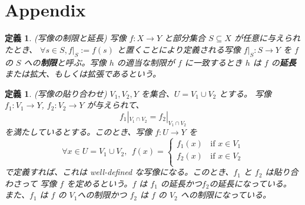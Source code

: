 \documentclass[uplatex, 12pt]{jsreport}
\newtheorem{dfn}[thm]{定義}
\begin{document}
\chapter*{Appendix}

\begin{dfn}{(写像の制限と延長)}
    写像 $f:X \to Y$ と部分集合 $S \subseteq X$ が任意に与えられたとき、
    $\forall s \in S, f|_S := f(s)$ と置くことにより定義される写像 $f|_S: S \to Y$ を
    $f$ の $S$ への\textbf{制限}と呼ぶ。写像 $h$ の適当な制限が $f$ に一致するとき $h$ は
     $f$ の\textbf{延長}または拡大、もしくは拡張であるという。
\end{dfn}

\begin{dfn}{(写像の貼り合わせ)}
    $V_1, V_2, Y$ を集合、$U = V_1 \cup V_2$ とする。
    写像 $f_1 : V_1 \to Y$, $f_2 : V_2 \to Y$ が与えられて、
    \[
        f_1|_{V_1 \cap V_2} = f_2|_{V_1 \cap V_2}
    \]
    を満たしているとする。このとき、写像 $f: U \to Y$ を
    \[
        \forall x \in U = V_1 \cup V_2, \ \ f(x) =
        \begin{cases}
            f_1(x) \ \ \ \ \text{if } x \in V_1 \\
            f_2(x) \ \ \ \ \text{if } x \in V_2 \\
        \end{cases}
    \]
    で定義すれば、これは well-defined な写像になる。このとき、$f_1$ と $f_2$ は貼り合わさって
    写像 $f$ を定めるという。$f$ は $f_1$ の延長かつ$f_2$の延長になっている。
    また、$f_1$ は $f$ の $V_1$への制限かつ $f_2$ は $f$ の $V_2$ への制限になっている。
    \end{dfn}
\end{document}
